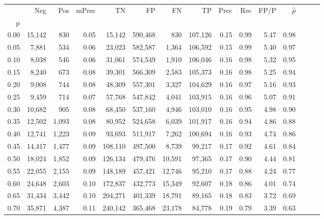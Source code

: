 \begin{tabular}{rrrrrrrrrrrrrrr}
\toprule
{} &     Neg &     Pos & mPrec &       TN &       FP &       FN &       TP &  Prec &   Rec &  FP/P & $\hat{p}$ \\
p    &         &         &       &          &          &          &          &       &       &       &           \\
\midrule
0.00 &  15,142 &     830 &  0.05 &   15,142 &  590,468 &      830 &  107,126 &  0.15 &  0.99 &  5.47 &      0.98 \\
0.05 &   7,881 &     534 &  0.06 &   23,023 &  582,587 &    1,364 &  106,592 &  0.15 &  0.99 &  5.40 &      0.97 \\
0.10 &   8,038 &     546 &  0.06 &   31,061 &  574,549 &    1,910 &  106,046 &  0.16 &  0.98 &  5.32 &      0.95 \\
0.15 &   8,240 &     673 &  0.08 &   39,301 &  566,309 &    2,583 &  105,373 &  0.16 &  0.98 &  5.25 &      0.94 \\
0.20 &   9,008 &     744 &  0.08 &   48,309 &  557,301 &    3,327 &  104,629 &  0.16 &  0.97 &  5.16 &      0.93 \\
0.25 &   9,459 &     714 &  0.07 &   57,768 &  547,842 &    4,041 &  103,915 &  0.16 &  0.96 &  5.07 &      0.91 \\
0.30 &  10,682 &     905 &  0.08 &   68,450 &  537,160 &    4,946 &  103,010 &  0.16 &  0.95 &  4.98 &      0.90 \\
0.35 &  12,502 &   1,093 &  0.08 &   80,952 &  524,658 &    6,039 &  101,917 &  0.16 &  0.94 &  4.86 &      0.88 \\
0.40 &  12,741 &   1,223 &  0.09 &   93,693 &  511,917 &    7,262 &  100,694 &  0.16 &  0.93 &  4.74 &      0.86 \\
0.45 &  14,417 &   1,477 &  0.09 &  108,110 &  497,500 &    8,739 &   99,217 &  0.17 &  0.92 &  4.61 &      0.84 \\
0.50 &  18,024 &   1,852 &  0.09 &  126,134 &  479,476 &   10,591 &   97,365 &  0.17 &  0.90 &  4.44 &      0.81 \\
0.55 &  22,055 &   2,155 &  0.09 &  148,189 &  457,421 &   12,746 &   95,210 &  0.17 &  0.88 &  4.24 &      0.77 \\
0.60 &  24,648 &   2,603 &  0.10 &  172,837 &  432,773 &   15,349 &   92,607 &  0.18 &  0.86 &  4.01 &      0.74 \\
0.65 &  31,434 &   3,442 &  0.10 &  204,271 &  401,339 &   18,791 &   89,165 &  0.18 &  0.83 &  3.72 &      0.69 \\
0.70 &  35,871 &   4,387 &  0.11 &  240,142 &  365,468 &   23,178 &   84,778 &  0.19 &  0.79 &  3.39 &      0.63 \\

\end{tabular}
